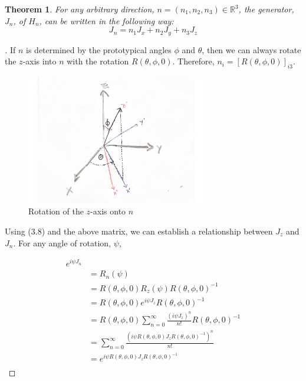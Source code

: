 \documentclass[10pt]{ucthesis}
\newcommand{\R}{\mathbb{R}}
\newtheorem{theorem}[definition]{Theorem}
\begin{document}
\begin{theorem}
	 For any arbitrary direction, $n=(n_1,n_2,n_3)\in\R^3$, the generator, $J_n$, of $H_n$, can be written in the following way:
$$J_n = n_1J_x + n_2J_y + n_3J_z$$
\end{theorem}
\noindent \begin{proof}[\cite{Tung}] If $n$ is determined by the prototypical angles $\phi$ and $\theta$, then we can always rotate the $z$-axis into $n$ with the rotation $R(\theta,\phi,0)$. Therefore, $n_i = [R(\theta,\phi,0)]_{i3}$.

\begin{figure}[H]
	\centering
	\includegraphics[width=0.7\textwidth]{pushzton}
	\caption{Rotation of the $z$-axis onto $n$}
\end{figure}

Using (3.8) and the above matrix, we can establish a relationship between $J_z$ and $J_n$. For any angle of rotation, $\psi$,

\begin{equation}
	\begin{aligned}
		e^{i\psi J_n} \\
							&= R_n(\psi)	\\
							&=R(\theta,\phi,0)R_z(\psi)R(\theta,\phi,0)^{-1}\\
							&=R(\theta,\phi,0) e^{i\psi J_z} R(\theta,\phi,0)^{-1}\\ 
							&= R(\theta,\phi,0) \sum_{n=0}^\infty \frac{(i\psi J_z)^n}{n!} R(\theta,\phi,0)^{-1} \\
							&= \sum_{n=0}^\infty \frac{(i\psi R(\theta,\phi,0)J_zR(\theta,\phi,0)^{-1})^n}{n!} \\
							&= e^{i\psi R(\theta,\phi,0)J_z R(\theta,\phi,0)^{-1}}\\
	\end{aligned}
\end{equation}


\end{proof}
\end{document}
